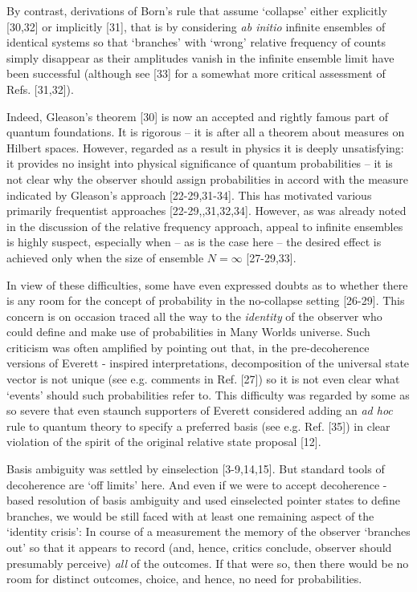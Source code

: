 \documentclass[aps,pra,epsfig,11pt,floatfix]{revtex4}
\begin{document}
By contrast, derivations of Born's rule that assume `collapse' either
explicitly [30,32] or implicitly [31], that is by considering {\it ab initio} infinite 
ensembles of identical systems so that `branches' with `wrong' relative
frequency of counts simply disappear as their amplitudes vanish in 
the infinite ensemble limit have been successful (although see [33]
for a somewhat more critical assessment of Refs. [31,32]). 

Indeed, Gleason's theorem [30] is now an accepted and rightly famous 
part of quantum foundations. It is rigorous -- it is after all a theorem about 
measures on Hilbert spaces. However, regarded as a result in physics 
it is deeply unsatisfying: it provides no insight into physical significance
of quantum probabilities -- it is not clear why the observer should assign 
probabilities in accord with the measure indicated by Gleason's 
approach [22-29,31-34]. This has motivated various primarily frequentist 
approaches [22-29,,31,32,34]. However, as was already noted in 
the discussion of the relative frequency approach, appeal to infinite
ensembles is highly suspect, especially when -- as is the case here -- the
desired effect is achieved only when the size of ensemble $N = \infty$ [27-29,33].

In view of these difficulties, some have even expressed doubts as to whether
there is any room for the concept of probability in the no-collapse setting
[26-29]. This concern is on occasion traced all the way to the {\it identity}
of the observer who could define and make use of probabilities in Many Worlds
universe. Such criticism was often amplified by pointing out that,
in the pre-decoherence versions of Everett - inspired interpretations,
decomposition of the universal state vector is not unique (see e.g. comments
in Ref. [27]) so it is not even clear what `events' should such probabilities
refer to. This difficulty was regarded by some as so severe
that even staunch supporters of Everett considered adding an {\it ad hoc} rule
to quantum theory to specify a preferred basis (see e.g. Ref. [35]) in clear
violation of the spirit of the original relative state proposal [12].

Basis ambiguity was settled by einselection [3-9,14,15]. But standard tools of
decoherence are `off limits' here. And even if we were to accept decoherence -
based resolution of basis ambiguity and used einselected pointer states to
define branches, we would be still faced with at least one remaining aspect of
the `identity crisis': In course of a measurement the memory of the observer
`branches out' so that it appears to record (and, hence, critics conclude,
observer should presumably perceive) {\it all} of the outcomes. If that were so,
then there would be no room for distinct outcomes, choice, and hence, no need
for probabilities.
\end{document}
